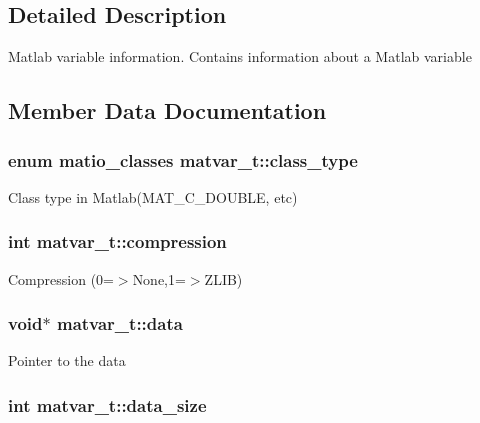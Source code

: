 \subsection{Detailed Description}
Matlab variable information. Contains information about a Matlab variable 

\subsection{Member Data Documentation}
\hypertarget{structmatvar__t_aff13035bf3265dd7d9425e5d40c839d4}{
\subsubsection[{class\_\-type}]{\setlength{\rightskip}{0pt plus 5cm}enum {\bf matio\_\-classes} {\bf matvar\_\-t::class\_\-type}}}
\label{structmatvar__t_aff13035bf3265dd7d9425e5d40c839d4}
Class type in Matlab(MAT\_\-C\_\-DOUBLE, etc) \hypertarget{structmatvar__t_a327abc8f4be853b9f26bc054ce1029e5}{
\subsubsection[{compression}]{\setlength{\rightskip}{0pt plus 5cm}int {\bf matvar\_\-t::compression}}}
\label{structmatvar__t_a327abc8f4be853b9f26bc054ce1029e5}
Compression (0=$>$None,1=$>$ZLIB) \hypertarget{structmatvar__t_a70d5c21dc70558757770d4d72ff5d3f4}{
\subsubsection[{data}]{\setlength{\rightskip}{0pt plus 5cm}void$\ast$ {\bf matvar\_\-t::data}}}
\label{structmatvar__t_a70d5c21dc70558757770d4d72ff5d3f4}
Pointer to the data \hypertarget{structmatvar__t_a9ad1c82e2b568da617e12dc73a26e1f9}{
\subsubsection[{data\_\-size}]{\setlength{\rightskip}{0pt plus 5cm}int {\bf matvar\_\-t::data\_\-size}}}
\label{structmatvar__t_a9ad1c82e2b568da617e12dc73a26e1f9}

